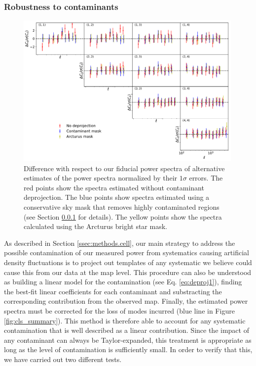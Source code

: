 \documentclass[a4paper,11pt]{article}
\begin{document}
    \subsubsection{Robustness to contaminants} \label{sssec:results.spectra.syst}
      \begin{figure}
        \centering
        \includegraphics[width=0.99\textwidth]{figures/cls_systematics.pdf}
        \caption{Difference with respect to our fiducial power spectra of alternative estimates of the power spectra normalized by their $1\sigma$ errors. The red points show the spectra estimated without contaminant deprojection. The blue points show spectra estimated using a conservative sky mask that removes highly contaminated regions (see Section \ref{sssec:results.spectra.syst} for details). The yellow points show the spectra calculated using the Arcturus bright star mask.}
        \label{fig:cls_systematics}
      \end{figure}
      As described in Section \ref{ssec:methods.cell}, our main strategy to address the possible contamination of our measured power from systematics causing artificial density fluctuations is to project out templates of any systematic we believe could cause this from our data at the map level. This procedure can also be understood as building a linear model for the contamination (see Eq. \ref{eq:deproj1}), finding the best-fit linear coefficients for each contaminant and substracting the corresponding contribution from the observed map. Finally, the estimated power spectra must be corrected for the loss of modes incurred (blue line in Figure \ref{fig:cls_summary}). This method is therefore able to account for any systematic contamination that is well described as a linear contribution. Since the impact of any contaminant can always be Taylor-expanded, this treatment is appropriate as long as the level of contamination is sufficiently small. In order to verify that this, we have carried out two different tests.
      
\end{document}
